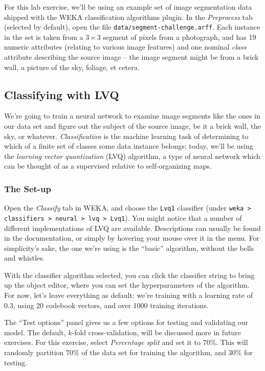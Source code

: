 \documentclass[11pt]{cselabheader}
\begin{document}
For this lab exercise, we'll be using an example set of image segmentation data shipped with the WEKA classification algorithms plugin. In the \textit{Preprocess} tab (selected by default), open the file \texttt{data/segment-challenge.arff}. Each instance in the set is taken from a $3 \times 3$ segment of pixels from a photograph, and has 19 numeric attributes (relating to various image features) and one nominal \textit{class} attribute describing the source image -- the image segment might be from a brick wall, a picture of the sky, foliage, et cetera.

\subsection{Classifying with LVQ}

We're going to train a neural network to examine image segments like the ones in our data set and figure out the subject of the source image, be it a brick wall, the sky, or whatever. \textit{Classification} is the machine learning task of determining to which of a finite set of classes some data instance belongs; today, we'll be using the \textit{learning vector quantization} (LVQ) algorithm, a type of neural network which can be thought of as a supervised relative to self-organizing maps.

\subsubsection{The Set-up}

Open the \textit{Classify} tab in WEKA, and choose the \texttt{Lvq1} classifier (under \texttt{weka > classifiers > neural > lvq > Lvq1}). You might notice that a number of different implementations of LVQ are available. Descriptions can usually be found in the documentation, or simply by hovering your mouse over it in the menu. For simplicity's sake, the one we're using is the ``basic'' algorithm, without the bells and whistles.

With the classifier algorithm selected, you can click the classifier string to bring up the object editor, where you can set the hyperparameters of the algorithm. For now, let's leave everything as default: we're training with a learning rate of 0.3, using 20 codebook vectors, and over 1000 training iterations.

The ``Test options'' panel gives us a few options for testing and validating our model. The default, $k$-fold cross-validation, will be discussed more in future exercises. For this exercise, select \textit{Percentage split} and set it to 70\%. This will randomly partition 70\% of the data set for training the algorithm, and 30\% for testing.
\end{document}
